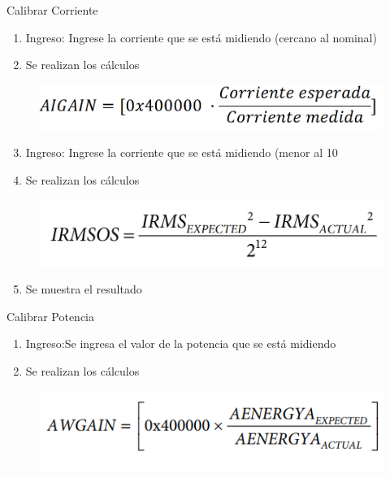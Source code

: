 Calibrar Corriente

\begin{enumerate}
\item Ingreso: Ingrese la corriente que se está midiendo (cercano al nominal)
\item Se realizan los cálculos
\end{enumerate}

\begin{figure}[!htb]
	\centering
	\includegraphics[width=\textwidth , keepaspectratio]{Figures/ApendixA/ec3.png}
	\label{fig:ecu3A}
\end{figure}

\begin{enumerate}
\setcounter{enumi}{2}
\item Ingreso: Ingrese la corriente que se está midiendo (menor al 10%
\item Se realizan los cálculos
\end{enumerate}
\begin{figure}[!htb]
	\centering
	\includegraphics[width=\textwidth , keepaspectratio]{Figures/ApendixA/ec4.png}
	\label{fig:ecu4A}
\end{figure}

\begin{enumerate}
\setcounter{enumi}{4}
\item Se muestra el resultado
\end{enumerate}

Calibrar Potencia
\begin{enumerate}
\item Ingreso:Se ingresa el valor de la potencia que se está midiendo
\item Se realizan los cálculos
\end{enumerate}

\begin{figure}[!htb]
	\centering
	\includegraphics[width=\textwidth , keepaspectratio]{Figures/ApendixA/ec5.png}
	\label{fig:ecu5A}
\end{figure}

